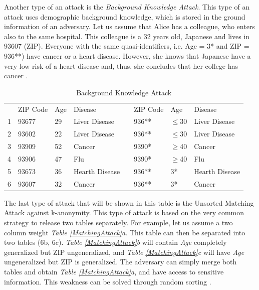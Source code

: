 \documentclass{llncs}
\begin{document}
Another type of an attack is the \textit{Background Knowledge Attack}. This type of an attack uses demographic background knowledge, which is stored in the ground information of an adversary. Let us assume that Alice has a colleague, who enters also to the same hospital. This colleague is a 32 years old, Japanese and lives in 93607 (ZIP). Everyone with the same quasi-identifiers, i.e. Age = 3* and ZIP = 936**) have cancer or a heart disease. However, she knows that Japanese have a very low risk of a heart disease and, thus, she concludes that her college has cancer \cite{ldiversity}.
\begin{table}[]
	\centering
	\caption{Background Knowledge Attack}
	\label{tablebackground}
	\begin{tabular}{@{}llllllll@{}}
		\cmidrule(r){1-4} \cmidrule(l){6-8}
		& ZIP Code & Age & Disease        &  & ZIP Code & Age      & Disease        \\ \cmidrule(r){1-4} \cmidrule(l){6-8} 
		1 & 93677    & 29  & Liver Disease   &  & 936**    & $\leq$30 & Liver Disease   \\
		2 & 93602    & 22  & Liver Disease   &  & 936**    & $\leq$30 & Liver Disease   \\
		3 & 93909    & 52  & Cancer         &  & 9390*    & $\geq$40 & Cancer         \\
		4 & 93906    & 47  & Flu            &  & 9390*    & $\geq$40 & Flu            \\
		5 & 93673    & 36  & Hearth Disease &  & 936**    & 3*       & Hearth Disease \\
		6 & 93607    & 32  & Cancer         &  & 936**    & 3*       & Cancer         \\ \cmidrule(r){1-4} \cmidrule(l){6-8} 
	\end{tabular}
\end{table}

The last type of attack that will be shown in this table is the Unsorted Matching Attack against k-anonymity. This type of attack is based on the very common strategy to release two tables separately. For example, let us assume a two column weight \textit{Table \ref{MatchingAttack}a}. This table can then be separated into two tables (6b, 6c). \textit{Table \ref{MatchingAttack}b} will contain \textit{Age} completely generalized but ZIP ungeneralized, and \textit{Table \ref{MatchingAttack}c} will have \textit{Age} ungeneralized but ZIP is generalized. The adversary can simply merge both tables and obtain \textit{Table \ref{MatchingAttack}a}, and have access to sensitive information. This weakness can be solved through random sorting \cite{meyerson2004complexity}.
\end{document}
